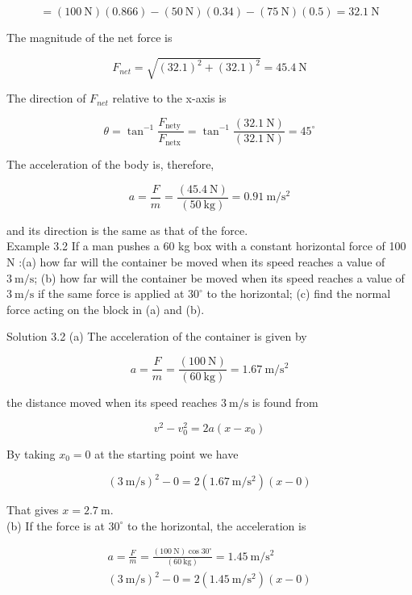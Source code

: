 \documentclass[10pt]{article}
\numberwithin{equation}{section}
\begin{document}
$$
=(100 \mathrm{~N})(0.866)-(50 \mathrm{~N})(0.34)-(75 \mathrm{~N})(0.5)=32.1 \mathrm{~N}
$$

The magnitude of the net force is

$$
F_{n e t}=\sqrt{(32.1)^{2}+(32.1)^{2}}=45.4 \mathrm{~N}
$$

The direction of $F_{n e t}$ relative to the x-axis is

$$
\theta=\tan ^{-1} \frac{F_{\text {nety }}}{F_{\text {netx }}}=\tan ^{-1} \frac{(32.1 \mathrm{~N})}{(32.1 \mathrm{~N})}=45^{\circ}
$$

The acceleration of the body is, therefore,

$$
a=\frac{F}{m}=\frac{(45.4 \mathrm{~N})}{(50 \mathrm{~kg})}=0.91 \mathrm{~m} / \mathrm{s}^{2}
$$

and its direction is the same as that of the force.\\
Example 3.2 If a man pushes a 60 kg box with a constant horizontal force of 100 N :(a) how far will the container be moved when its speed reaches a value of $3 \mathrm{~m} / \mathrm{s}$; (b) how far will the container be moved when its speed reaches a value of $3 \mathrm{~m} / \mathrm{s}$ if the same force is applied at $30^{\circ}$ to the horizontal; (c) find the normal force acting on the block in (a) and (b).

Solution 3.2 (a) The acceleration of the container is given by

$$
a=\frac{F}{m}=\frac{(100 \mathrm{~N})}{(60 \mathrm{~kg})}=1.67 \mathrm{~m} / \mathrm{s}^{2}
$$

the distance moved when its speed reaches $3 \mathrm{~m} / \mathrm{s}$ is found from

$$
v^{2}-v_{0}^{2}=2 a\left(x-x_{0}\right)
$$

By taking $x_{0}=0$ at the starting point we have

$$
(3 \mathrm{~m} / \mathrm{s})^{2}-0=2\left(1.67 \mathrm{~m} / \mathrm{s}^{2}\right)(x-0)
$$

That gives $x=2.7 \mathrm{~m}$.\\
(b) If the force is at $30^{\circ}$ to the horizontal, the acceleration is

$$
\begin{gathered}
a=\frac{F}{m}=\frac{(100 \mathrm{~N}) \cos 30^{\circ}}{(60 \mathrm{~kg})}=1.45 \mathrm{~m} / \mathrm{s}^{2} \\
(3 \mathrm{~m} / \mathrm{s})^{2}-0=2\left(1.45 \mathrm{~m} / \mathrm{s}^{2}\right)(x-0)
\end{gathered}
$$
\end{document}
